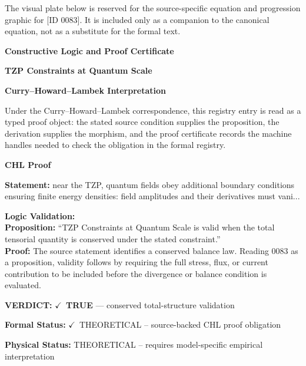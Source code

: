 \begingroup\footnotesize\sloppy
The visual plate below is reserved for the source-specific equation and progression graphic for [ID 0083]. It is included only as a companion to the canonical equation, not as a substitute for the formal text.
\par\endgroup
\ifTZPDarkEdition
{}
\fi

\clearpage
\begingroup\tzpsupportsetup
\noindent\textbf{\fontsize{10.8pt}{12.8pt}\selectfont [ID 0083] Constructive Logic and Proof Certificate}\par
\noindent\textbf{\fontsize{10pt}{12pt}\selectfont TZP Constraints at Quantum Scale}\par
\vspace{0.45em}
\begingroup
\footnotesize
\setlength{\parskip}{0.22em}
\setlength{\parindent}{0pt}
\noindent\textbf{Curry--Howard--Lambek Interpretation}\par
Under the Curry--Howard--Lambek correspondence, this registry entry is read as a typed proof
object: the stated source condition supplies the proposition, the derivation supplies the
morphism, and the proof certificate records the machine handles needed to check the obligation
in the formal registry.

\vspace{0.45em}
\noindent\textbf{CHL Proof}\par
\textbf{Statement:} near the TZP, quantum fields obey additional boundary conditions ensuring finite energy
densities: field amplitudes and their derivatives must vani...

\textbf{Logic Validation:}\\
\textbf{Proposition:} ``TZP Constraints at Quantum Scale is valid when the total tensorial quantity is conserved
under the stated constraint.''\\
\textbf{Proof:} The source statement identifies a conserved balance law. Reading 0083 as a proposition,
validity follows by requiring the full stress, flux, or current contribution to be
included before the divergence or balance condition is evaluated.

\textbf{VERDICT:} \ensuremath{\checkmark}\ \textbf{TRUE} --- conserved total-structure validation

\textbf{Formal Status:} \ensuremath{\checkmark}\ THEORETICAL -- source-backed CHL proof obligation

\textbf{Physical Status:} THEORETICAL -- requires model-specific empirical interpretation
\par\vspace{0.45em}
\par
\ifTZPDarkEdition
{}
\fi
\endgroup
\endgroup
